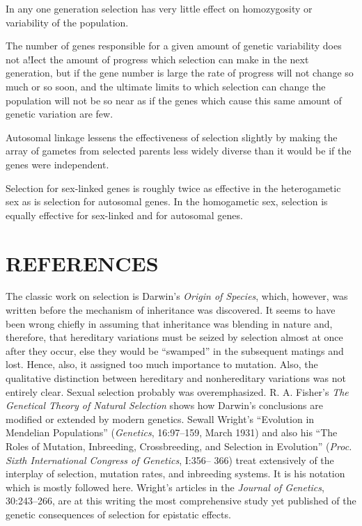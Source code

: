 \begin{enumerate}
In any one generation selection has very little effect on homozygosity
or variability of the population.

The number of genes responsible for a given amount of genetic
variability does not a!Iect the amount of progress which selection can
make in the next generation, but if the gene number is large the rate
of progress will not change so much or so soon, and the ultimate limits
to which selection can change the population will not be so near as if
the genes which cause this same amount of genetic variation are few.

Autosomal linkage lessens the effectiveness of selection slightly by
making the array of gametes from selected parents less widely diverse
than it would be if the genes were independent.

Selection for sex-linked genes is roughly twice as effective in the
heterogametic sex as is selection for autosomal genes. In the homogametic
sex, selection is equally effective for sex-linked and for autosomal
genes.
\end{enumerate}

\section*{REFERENCES}

The classic work on selection is Darwin's \textit{Origin of Species}, which,
however, was written before the mechanism of inheritance was discovered.
It seems to have been wrong chiefly in assuming that inheritance
was blending in nature and, therefore, that hereditary variations must
be seized by selection almost at once after they occur, else they would be
``swamped'' in the subsequent matings and lost. Hence, also, it assigned
too much importance to mutation. Also, the qualitative distinction
between hereditary and nonhereditary variations was not entirely clear.
Sexual selection probably was overemphasized. R. A. Fisher's \textit{The Genetical
Theory of Natural Selection} shows how Darwin's conclusions are
modified or extended by modern genetics. Sewall Wright's ``Evolution
in Mendelian Populations'' (\textit{Genetics}, 16:97--159, March 1931) and also
his ``The Roles of Mutation, Inbreeding, Crossbreeding, and Selection
in Evolution'' (\textit{Proc. Sixth International Congress of Genetics}, I:356--
366) treat extensively of the interplay of selection, mutation rates, and
inbreeding systems. It is his notation which is mostly followed here.
Wright's articles in the \textit{Journal of Genetics}, 30:243--266, are at this writing
the most comprehensive study yet published of the genetic consequences
of selection for epistatic effects.